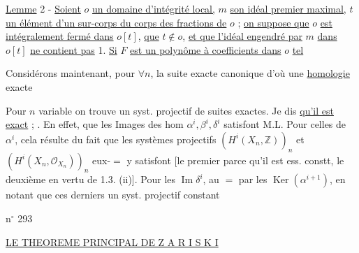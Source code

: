 \uline{Lemme} 2 - \uline{Soient} $o$ \uline{un domaine d'intégrité local,} $m$ \uline{son idéal premier maximal,} $t$ \uline{un élément d'un sur-corps du corps des fractions de} $o$ ; \uline{on suppose que} $o$ \uline{est intégralement fermé dans} $o[t]$, \uline{que} $t\notin o$, \uline{et que l'idéal engendré par} $m$ \uline{dans} $o[t]$ \uline{ne contient pas} 1. \uline{Si} $F$ \uline{est un polynôme à coefficients dans} $o$ \uline{tel}

Considérons maintenant, pour $\forall n$, la suite exacte canonique
d'où une \uline{homologie} exacte

Pour $n$ variable on trouve un syst.  projectif de suites exactes. Je dis \uline{qu'il est exact} ; . En effet,   que les Images des hom $\alpha^i,\beta^i,\delta^i$ satisfont M.L. Pour celles de $\alpha^i$, cela résulte du fait que  les systèmes projectifs $(H^i(X_n,\mathbb Z))_n$ et $(H^i(X_n,\mathcal O_{X_n}))_n$ eux-$=$ y satisfont [le premier parce qu'il est ess. constt, le deuxième en vertu de 1.3. (ii)]. Pour les $\operatorname{Im}\delta^i$,  au $=$ par les $\operatorname{Ker}(\alpha^{i+1})$, en notant que ces derniers   un syst. projectif constant

n$^\circ$ 293

\uline{LE THEOREME PRINCIPAL DE Z A R I S K I}

